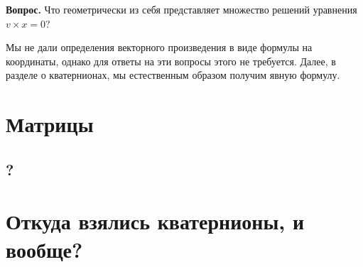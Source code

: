\documentclass[a4paper,12pt]{article}
\begin{document}
\noindent\textbf{Вопрос.} Что геометрически из себя представляет множество решений уравнения $v \times x = 0$?

Мы не дали определения векторного произведения в виде формулы на координаты, однако для ответы на эти вопросы этого не требуется. Далее, в разделе о кватернионах, мы естественным образом получим явную формулу.

\section*{Матрицы}
\subsection*{?}

\section*{Откуда взялись кватернионы, и вообще?}



\newpage
\nocite{*}
\printbibliography[nottype=unpublished]
\end{document}
